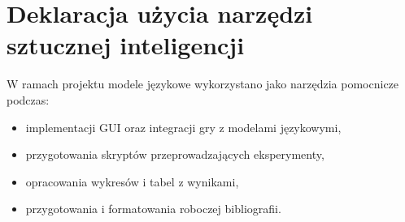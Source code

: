 \documentclass[11pt, a4paper]{article}
\begin{document}
\section{Deklaracja użycia narzędzi sztucznej inteligencji}
W ramach projektu modele językowe wykorzystano jako narzędzia pomocnicze podczas:
\begin{itemize}
    \item implementacji GUI oraz integracji gry z modelami językowymi,
    \item przygotowania skryptów przeprowadzających eksperymenty,
    \item opracowania wykresów i tabel z wynikami,
    \item przygotowania i formatowania roboczej bibliografii.
\end{itemize}

\newpage


\end{document}
